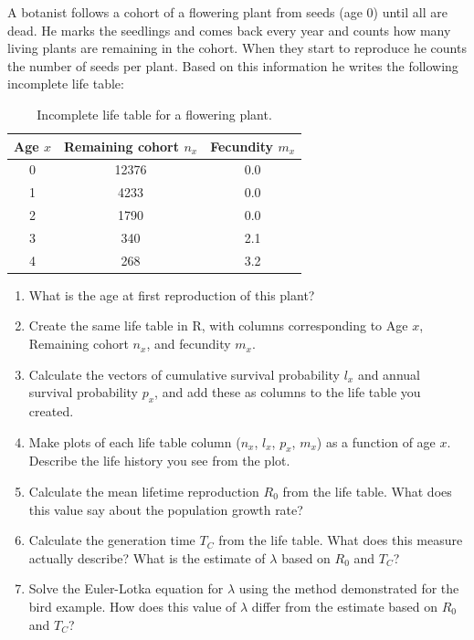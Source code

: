 \documentclass[
]{book}
\begin{document}
A botanist follows a cohort of a flowering plant from seeds (age 0) until all are dead. He marks the seedlings and comes back every year and counts how many living plants are remaining in the cohort. When they start to reproduce he counts the number of seeds per plant. Based on this information he writes the following incomplete life table:

\begin{table}

\caption{\label{tab:unnamed-chunk-6}Incomplete life table for a flowering plant.}
\centering
\begin{tabular}[t]{c|c|c}
\hline
Age $x$ & Remaining cohort $n_x$ & Fecundity $m_x$\\
\hline
0 & 12376 & 0.0\\
\hline
1 & 4233 & 0.0\\
\hline
2 & 1790 & 0.0\\
\hline
3 & 340 & 2.1\\
\hline
4 & 268 & 3.2\\
\hline
\end{tabular}
\end{table}

\begin{enumerate}
\def\labelenumi{\arabic{enumi}.}
\item
  What is the age at first reproduction of this plant?
\item
  Create the same life table in R, with columns corresponding to Age \(x\), Remaining cohort \(n_x\), and fecundity \(m_x\).
\item
  Calculate the vectors of cumulative survival probability \(l_x\) and annual survival probability \(p_x\), and add these as columns to the life table you created.
\item
  Make plots of each life table column (\(n_x\), \(l_x\), \(p_x\), \(m_x\)) as a function of age \(x\). Describe the life history you see from the plot.
\item
  Calculate the mean lifetime reproduction \(R_0\) from the life table. What does this value say about the population growth rate?
\item
  Calculate the generation time \(T_C\) from the life table. What does this measure actually describe? What is the estimate of \(\lambda\) based on \(R_0\) and \(T_C\)?
\item
  Solve the Euler-Lotka equation for \(\lambda\) using the method demonstrated for the bird example. How does this value of \(\lambda\) differ from the estimate based on \(R_0\) and \(T_C\)?
\end{enumerate}
\end{document}
